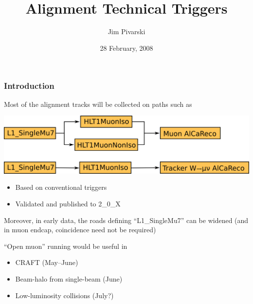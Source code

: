 \documentclass[compress]{beamer}
\title{Alignment Technical Triggers}
\author{Jim Pivarski}
\institute{Texas A\&M University}
\date{28 February, 2008}
\begin{document}
\frame{\titlepage}


\begin{frame}
\frametitle{Introduction}
Most of the alignment tracks will be collected on paths such as
\begin{center}
\includegraphics[height=2 cm]{path_standard.png}
\end{center}

\vspace{-0.25 cm}
\begin{itemize}
\item Based on conventional triggers
\item Validated and published to 2\_0\_X
\end{itemize}

\vfill Moreover, in early data, the roads defining ``L1\_SingleMu7''
can be widened (and in muon endcap, coincidence need not be required)

\vfill ``Open muon'' running would be useful in
\begin{itemize}
\item CRAFT (May--June)
\item Beam-halo from single-beam (June)
\item Low-luminosity collisions (July?)
\end{itemize}
\end{frame}
\end{document}
